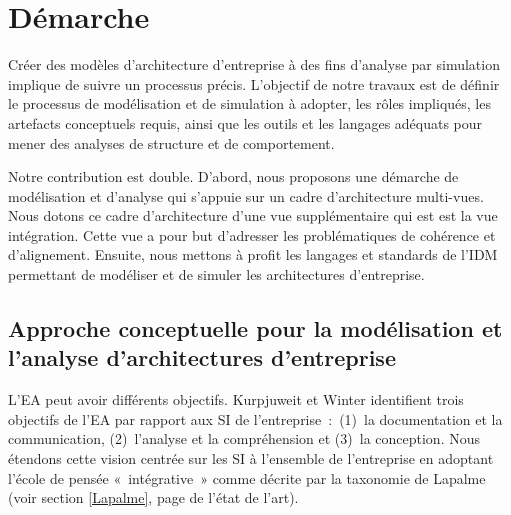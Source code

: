 \chapter{Démarche}
\label{chap:demarche}

Créer des modèles d'architecture d'entreprise à des fins d'analyse par simulation implique de suivre un processus précis. L'objectif de notre travaux est de définir le processus de modélisation et de simulation à adopter, les rôles impliqués, les artefacts conceptuels requis, ainsi que les outils et les langages adéquats pour mener des analyses de structure et de comportement. 

Notre contribution est double. D'abord, nous proposons une démarche de modélisation et d'analyse qui s'appuie sur un cadre d'architecture multi-vues. Nous dotons ce cadre d'architecture d'une vue supplémentaire qui est est la vue intégration. Cette vue a pour but d'adresser les problématiques de cohérence et d'alignement. Ensuite, nous mettons à profit les langages et standards de l'IDM permettant de modéliser et de simuler les architectures d'entreprise. 




\section{Approche conceptuelle pour la modélisation et l'analyse d'architectures d'entreprise}

L'EA peut avoir différents objectifs. Kurpjuweit et Winter \cite{kurpjuweit2007viewpoint} identifient trois objectifs de l'EA par rapport aux SI de l'entreprise~:~(1)~la documentation et la communication, (2)~l'analyse et la compréhension et (3)~la conception. Nous étendons cette vision centrée sur les SI à l'ensemble de l'entreprise en adoptant l'école de pensée «~intégrative~» comme décrite par la taxonomie de Lapalme (voir section \ref{Lapalme}, page \pageref{Lapalme} de l'état de l'art). 

